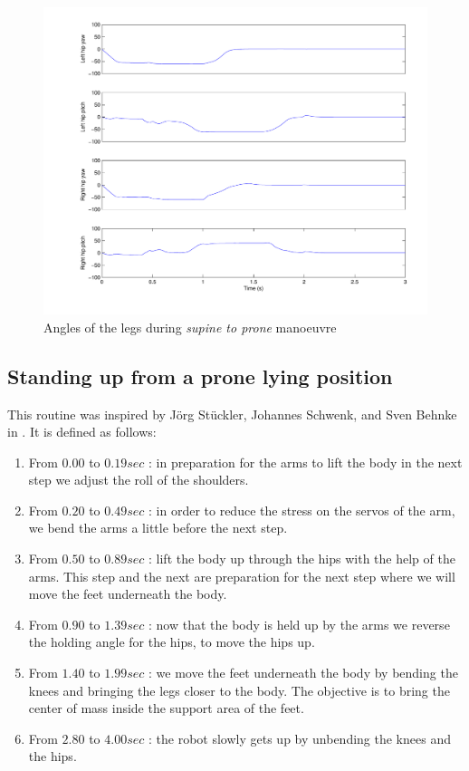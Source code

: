 \begin{figure}[htp]
\center
    \includegraphics[width = \textwidth]{figures/sup2proneLegs}
    \caption[Angles of the legs during \emph{supine to prone} manoeuvre]{Angles of the legs during \emph{supine to prone} manoeuvre}
    \label{fig:sup2proneLegs}
\end{figure}

\subsection{Standing up from a prone lying position}
This routine was inspired by Jörg Stückler, Johannes Schwenk, and Sven Behnke in \cite{Stuckler06}. It is defined as follows:\begin{enumerate}
\item From $0.00$ to $0.19sec$ : in preparation for the arms to lift the body in the next step we adjust the roll of the shoulders.

\item From $0.20$ to $0.49sec$ : in order to reduce the stress on the servos of the arm, we bend the arms a little before the next step.

\item From $0.50$ to $0.89sec$ : lift the body up through the hips with the help of the arms. This step and the next are preparation for the next step where we will move the feet underneath the body.

\item From $0.90$ to $1.39sec$ : now that the body is held up by the arms we reverse the holding angle for the hips, to move the hips up. 

\item From $1.40$ to $1.99sec$ :  we move the feet underneath the body by bending the knees and bringing the legs closer to the body. The objective is to bring the center of mass inside the support area of the feet.

\item From $2.80$ to $4.00sec$ : the robot slowly gets up by unbending the knees and the hips. 
\end{enumerate}

